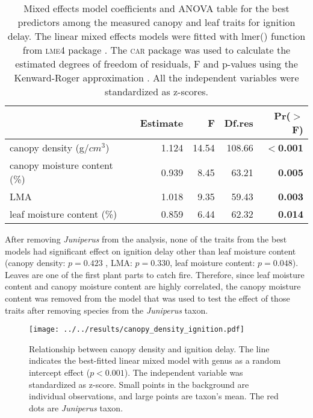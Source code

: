 \documentclass{ttuthes2007}
\newcommand{\pkg}[1]{\textsc{#1}}
\begin{document}
\begin{table}[ht]
  \centering
  \caption{Mixed effects model coefficients and ANOVA table for the best
    predictors among the measured canopy and leaf traits for ignition delay.
    The linear mixed effects models were fitted with lmer() function from \pkg{lme4}
    package \citep{bates2009package}. The \pkg{car} package
    \citep{fox2013hypothesis} was used to calculate the estimated degrees of
    freedom of residuals, F and p-values using the Kenward-Roger approximation
    \citep{kenward1997small}. All the independent variables were standardized
    as z-scores.}
  \begin{tabular}{lrrrr}
    \toprule
    & Estimate & F & Df.res & Pr($>$F) \\ 
    \midrule
    canopy density (g/{$cm^3$}) & 1.124 & 14.54  & 108.66 & \textbf{$<$0.001} \\ 
    canopy moisture content (\%) & 0.939 & 8.45 & 63.21 & \textbf{0.005} \\ 
    LMA & 1.018 & 9.35  & 59.43 & \textbf{0.003} \\  
    leaf moisture content (\%) & 0.859 & 6.44  & 62.32 & \textbf{0.014} \\ 
    \bottomrule
  \end{tabular}
  \label{tab:fandpforig_delay}
\end{table}

After removing \emph{Juniperus} from the analysis, %
none of the traits from the best models had significant effect on ignition delay other than leaf moisture content (canopy density: $p = 0.423$ , 
LMA: $p = 0.330$, leaf moisture content: $p = 0.048$). Leaves are one of the first plant parts to catch fire. Therefore, since leaf moisture content and canopy moisture content are highly correlated, the canopy moisture content was removed from the model that was used to test the effect of those traits after removing species from the \emph{Juniperus} taxon.






\begin{figure}[ht]
    \centering
    \texttt{[image: ../../results/canopy\_density\_ignition.pdf]}
    \caption[Canopy density effect on ignition delay]{\label{fig:canopy_density_ig_delay} Relationship between canopy density and ignition delay. The line indicates the best-fitted linear mixed model with genus as a random intercept effect ($p  < 0.001$). The independent variable was standardized  as z-score. Small points in the background are individual observations, and large points are taxon's mean. The red dots are \emph{Juniperus} taxon.}
\end{figure}
\end{document}
